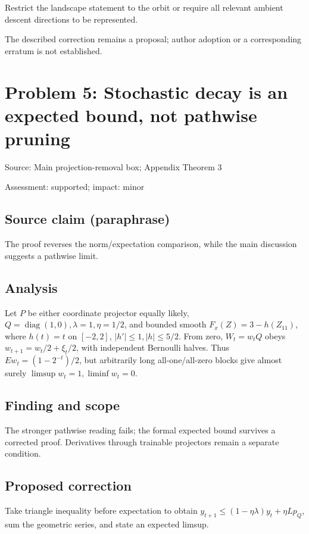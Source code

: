 \documentclass[11pt]{article}
\begin{document}
Restrict the landscape statement to the orbit or require all relevant ambient descent directions to be represented.

The described correction remains a proposal; author adoption or a corresponding erratum is not established.

\section*{Problem 5: Stochastic decay is an expected bound, not pathwise pruning}

Source: Main projection-removal box; Appendix Theorem 3

Assessment: supported; impact: minor

\subsection*{Source claim (paraphrase)}

The proof reverses the norm/expectation comparison, while the main discussion suggests a pathwise limit.

\subsection*{Analysis}

Let \(P\) be either coordinate projector equally likely, \(Q=\operatorname{diag}(1,0),\lambda=1,\eta=1/2\), and bounded smooth \(F_x(Z)=3-h(Z_{11})\), where \(h(t)=t\) on \([-2,2]\), \(|h'|\le1,|h|\le5/2\). From zero, \(W_t=w_tQ\) obeys \(w_{t+1}=w_t/2+\xi_t/2\), with independent Bernoulli halves. Thus \(Ew_t=(1-2^{-t})/2\), but arbitrarily long all-one/all-zero blocks give almost surely \(\limsup w_t=1,\liminf w_t=0\).

\subsection*{Finding and scope}

The stronger pathwise reading fails; the formal expected bound survives a corrected proof. Derivatives through trainable projectors remain a separate condition.

\subsection*{Proposed correction}

Take triangle inequality before expectation to obtain \(y_{t+1}\le(1-\eta\lambda)y_t+\eta Lp_Q\), sum the geometric series, and state an expected limsup.
\end{document}
